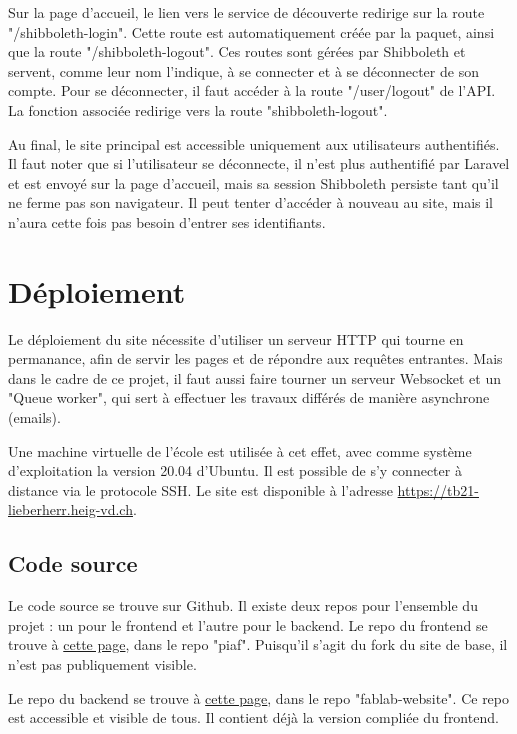 \documentclass[
    iai, %
    eai, %
]{heig-tb}
\begin{document}
Sur la page d'accueil, le lien vers le service de découverte redirige sur la route "/shibboleth-login". Cette route est automatiquement créée par la paquet, ainsi que la route "/shibboleth-logout". Ces routes sont gérées par Shibboleth et servent, comme leur nom l'indique, à se connecter et à se déconnecter de son compte.
Pour se déconnecter, il faut accéder à la route "/user/logout" de l'API. La fonction associée redirige vers la route "shibboleth-logout".

Au final, le site principal est accessible uniquement aux utilisateurs authentifiés. Il faut noter que si l'utilisateur se déconnecte, il n'est plus authentifié par Laravel et est envoyé sur la page d'accueil, mais sa session Shibboleth persiste tant qu'il ne ferme pas son navigateur. Il peut tenter d'accéder à nouveau au site, mais il n'aura cette fois pas besoin d'entrer ses identifiants.


\newpage
\chapter{Déploiement}
Le déploiement du site nécessite d'utiliser un serveur HTTP qui tourne en permanance, afin de servir les pages et de répondre aux requêtes entrantes. Mais dans le cadre de ce projet, il faut aussi faire tourner un serveur Websocket et un "Queue worker", qui sert à effectuer les travaux différés de manière asynchrone (emails).

Une machine virtuelle de l'école est utilisée à cet effet, avec comme système d'exploitation la version 20.04 d'Ubuntu. Il est possible de s'y connecter à distance via le protocole SSH. Le site est disponible à l'adresse \href{https://tb21-lieberherr.heig-vd.ch}{https://tb21-lieberherr.heig-vd.ch}.

\section{Code source}
Le code source se trouve sur Github. Il existe deux repos pour l'ensemble du projet : un pour le frontend et l'autre pour le backend.
Le repo du frontend se trouve à \href{https://github.com/TristanLieberherr/piaf}{cette page}, dans le repo "piaf". Puisqu'il s'agit du fork du site de base, il n'est pas publiquement visible.

Le repo du backend se trouve à \href{https://github.com/TristanLieberherr/fablab-website}{cette page}, dans le repo "fablab-website". Ce repo est accessible et visible de tous. Il contient déjà la version compliée du frontend.
\end{document}
